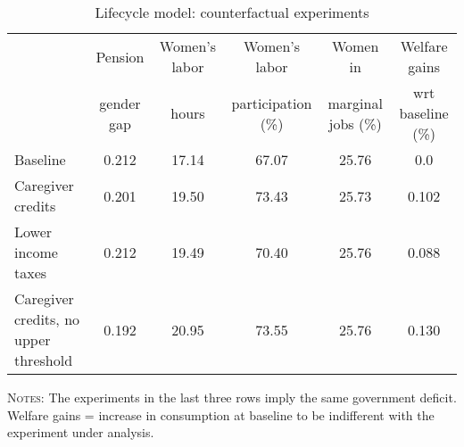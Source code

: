 \begin{table}[htbp]\caption{Lifecycle model: counterfactual experiments}\label{table:experiments}\centering\footnotesize\begin{tabular}{lccccc} \toprule & Pension & Women's labor & Women's labor & Women in &  Welfare gains  \\&gender gap &hours &  participation  (\%) & marginal jobs (\%)  & wrt baseline (\%)  \\\midrule    Baseline                                   &0.212&17.14&67.07&25.76& 0.0\\ Caregiver credits                          &0.201&19.50&73.43&25.73&0.102\\ Lower income taxes                         &0.212&19.49&70.40&25.76&0.088\\ Caregiver credits, no upper threshold      &0.192&20.95&73.55&25.76&0.130\\ \bottomrule
	\end{tabular}
{\raggedright \textsc{Notes:} The experiments in the last three rows imply the same government deficit. Welfare gains = increase in consumption at baseline to be indifferent with the experiment under analysis.\par}
      \end{table}